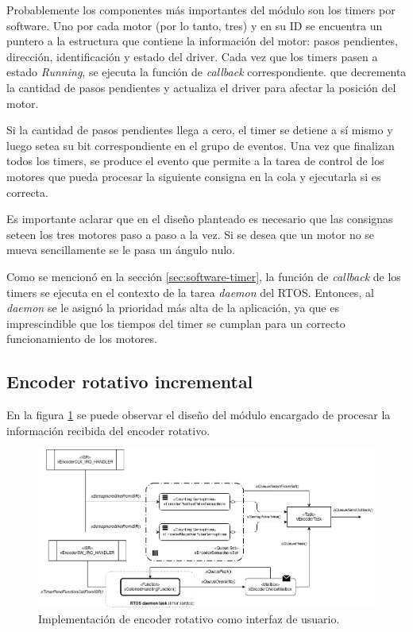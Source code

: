 \documentclass{IEEEtran}
\begin{document}
Probablemente los componentes más importantes del módulo son los timers por software. Uno por cada motor (por lo tanto, tres) y en su ID se encuentra un puntero a la estructura que contiene la información del motor: pasos pendientes, dirección, identificación y estado del driver. Cada vez que los timers pasen a estado \textit{Running}, se ejecuta la función de \textit{callback} correspondiente. que decrementa la cantidad de pasos pendientes y actualiza el driver para afectar la posición del motor. 

Si la cantidad de pasos pendientes llega a cero, el timer se detiene a sí mismo y luego setea su bit correspondiente en el grupo de eventos. Una vez que finalizan todos los timers, se produce el evento que permite a la tarea de control de los motores que pueda procesar la siguiente consigna en la cola y ejecutarla si es correcta. 

Es importante aclarar que en el diseño planteado es necesario que las consignas seteen los tres motores paso a paso a la vez. Si se desea que un motor no se mueva sencillamente se le pasa un ángulo nulo.

Como se mencionó en la sección \ref{sec:software-timer}, la función de \textit{callback} de los timers se ejecuta en el contexto de la tarea \textit{daemon} del RTOS. Entonces, al \textit{daemon} se le asignó la prioridad más alta de la aplicación, ya que es imprescindible que los tiempos del timer se cumplan para un correcto funcionamiento de los motores.

\subsection{Encoder rotativo incremental}
\label{sec:encoder}

En la figura \ref{fig:diagrama-encoder} se puede observar el diseño del módulo encargado de procesar la información recibida del encoder rotativo.

\begin{figure}[ht]
    \centering
    \includegraphics[scale=0.5]{../diagrama_encoder.png}
    \caption{Implementación de encoder rotativo como interfaz de usuario.}
    \label{fig:diagrama-encoder}
\end{figure}
\end{document}
